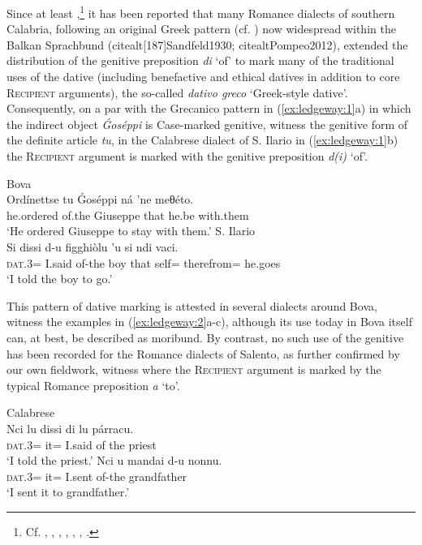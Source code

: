\documentclass[output=paper,modfonts,nonflat]{langsci/langscibook}
\begin{document}
Since at least \citet[§639]{Rohlfs1969},\footnote{Cf. \citet[§639]{Rohlfs1969}, \citet[232-233]{Trumper2003}, \citet[209]{Vincent1997}, \citet[243, 427-429]{Katsoyannou1995}, \citet[54-55]{Katsoyannou2001}, \citet[140-141]{Ralli2006}, \citet[192-196]{Ledgeway2013}.} it has been reported that many Romance dialects of southern Calabria, following an original Greek pattern (cf. \citealt[160]{Joseph1990}) now widespread within the Balkan Sprachbund (citealt[187]{Sandfeld1930}; citealt{Pompeo2012}), extended the distribution of the genitive preposition \textit{di} ‘of’ to mark many of the traditional uses of the dative (including benefactive and ethical datives in addition to core \textsc{Recipient} arguments), the so-called \textit{dativo greco} `Greek-style dative'. Consequently, on a par with the Grecanico pattern in (\ref{ex:ledgeway:1}a) in which the indirect object \textit{Ǵoséppi} is Case-marked genitive, witness the genitive form of the definite article \textit{tu}, in the Calabrese dialect of S. Ilario in (\ref{ex:ledgeway:1}b) the \textsc{Recipient} argument is marked with the genitive preposition \textit{d(i)} ‘of’. 

\ea\label{ex:ledgeway:1}
\ea  Bova  \\
  \gll Ordínettse  tu  Ǵoséppi  ná  ’ne  meθéto.\\  
    he.ordered  of.the  Giuseppe  that  he.be  with.them\\
    \glt `He ordered Giuseppe to stay with them.'
  \ex S. Ilario\\
    \gll Si  dissi  d-u  figghiòlu  ’u  si  ndi  vaci.\\ 
    \textsc{dat}.3=  I.said  of-the  boy  that  self=  therefrom=  he.goes \\
    \glt `I told the boy to go.'
    \z
    \z
    

This pattern of dative marking is attested in several dialects around Bova, witness the examples in (\ref{ex:ledgeway:2}a-c), although its use today in Bova itself can, at best, be described as moribund. By contrast, no such use of the genitive has been recorded for the Romance dialects of Salento, as further confirmed by our own fieldwork, witness  where the \textsc{Recipient} argument is marked by the typical Romance preposition \textit{a} ‘to’.

\ea\label{ex:ledgeway:2}
Calabrese  \\
\ea
	\gll Nci  lu  dissi  di  lu  párracu.\\
    \textsc{dat}.3=   it=  I.said  of  the  priest\\
    \glt `I told the priest.'
 \ex \gll Nci  u  mandai  d-u  nonnu.  \\
    \textsc{dat}.3=  it=  I.sent  of-the  grandfather\\
    \glt `I sent it to grandfather.'
    
\end{document}
